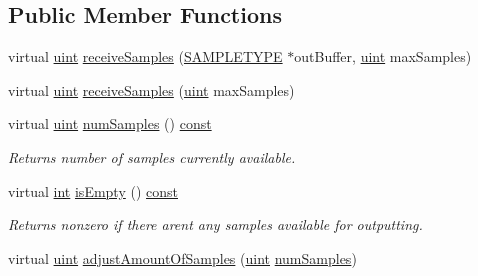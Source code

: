 \subsection*{Public Member Functions}
\begin{DoxyCompactItemize}
\item 
virtual \hyperlink{_s_t_types_8h_a91ad9478d81a7aaf2593e8d9c3d06a14}{uint} \hyperlink{classsoundtouch_1_1_f_i_f_o_processor_a2b3b5afd9d4f47f933db0a01bcc9e2a6}{receive\+Samples} (\hyperlink{namespacesoundtouch_a97cfd29a7abb4d4b2a72f803d5b5850c}{S\+A\+M\+P\+L\+E\+T\+Y\+PE} $\ast$out\+Buffer, \hyperlink{_s_t_types_8h_a91ad9478d81a7aaf2593e8d9c3d06a14}{uint} max\+Samples)
\item 
virtual \hyperlink{_s_t_types_8h_a91ad9478d81a7aaf2593e8d9c3d06a14}{uint} \hyperlink{classsoundtouch_1_1_f_i_f_o_processor_a19bfba3937f4b068005c1144c602e660}{receive\+Samples} (\hyperlink{_s_t_types_8h_a91ad9478d81a7aaf2593e8d9c3d06a14}{uint} max\+Samples)
\item 
virtual \hyperlink{_s_t_types_8h_a91ad9478d81a7aaf2593e8d9c3d06a14}{uint} \hyperlink{classsoundtouch_1_1_f_i_f_o_processor_a254a8506a4a93083c0e914aff361c674}{num\+Samples} () \hyperlink{getopt1_8c_a2c212835823e3c54a8ab6d95c652660e}{const} 
\begin{DoxyCompactList}\small\item\em Returns number of samples currently available. \end{DoxyCompactList}\item 
virtual \hyperlink{xmltok_8h_a5a0d4a5641ce434f1d23533f2b2e6653}{int} \hyperlink{classsoundtouch_1_1_f_i_f_o_processor_aa0badd93fa426cdfb8da4fc82025de7d}{is\+Empty} () \hyperlink{getopt1_8c_a2c212835823e3c54a8ab6d95c652660e}{const} 
\begin{DoxyCompactList}\small\item\em Returns nonzero if there aren\textquotesingle{}t any samples available for outputting. \end{DoxyCompactList}\item 
virtual \hyperlink{_s_t_types_8h_a91ad9478d81a7aaf2593e8d9c3d06a14}{uint} \hyperlink{classsoundtouch_1_1_f_i_f_o_processor_addb050f9ccdeb0aff6c3783388f3b7fb}{adjust\+Amount\+Of\+Samples} (\hyperlink{_s_t_types_8h_a91ad9478d81a7aaf2593e8d9c3d06a14}{uint} \hyperlink{classsoundtouch_1_1_f_i_f_o_processor_a254a8506a4a93083c0e914aff361c674}{num\+Samples})
\end{DoxyCompactItemize}
